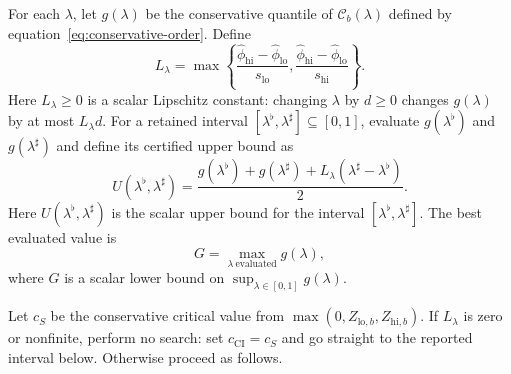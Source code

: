 \documentclass[11pt]{article}
\begin{document}
For each \(\lambda\), let \(g(\lambda)\) be the conservative quantile of
\(\mathcal C_b(\lambda)\) defined by equation~\eqref{eq:conservative-order}. Define
\begin{equation*}
 L_\lambda=\max\left\{
 \frac{\widehat\phi_{\mathrm{hi}}-\widehat\phi_{\mathrm{lo}}}{s_{\mathrm{lo}}},
 \frac{\widehat\phi_{\mathrm{hi}}-\widehat\phi_{\mathrm{lo}}}{s_{\mathrm{hi}}}
 \right\}.
\end{equation*}
Here \(L_\lambda\ge0\) is a scalar Lipschitz constant: changing \(\lambda\) by \(d\ge0\) changes
\(g(\lambda)\) by at most \(L_\lambda d\). For a retained interval \([\lambda^{\flat},\lambda^{\sharp}]\subseteq[0,1]\), evaluate
\(g(\lambda^{\flat})\) and \(g(\lambda^{\sharp})\) and define its certified upper bound as
\begin{equation*}
 U(\lambda^{\flat},\lambda^{\sharp})=\frac{g(\lambda^{\flat})+g(\lambda^{\sharp})+L_\lambda(\lambda^{\sharp}-\lambda^{\flat})}{2}.
\end{equation*}
Here \(U(\lambda^{\flat},\lambda^{\sharp})\) is the scalar upper bound for the interval
\([\lambda^{\flat},\lambda^{\sharp}]\). The best evaluated value is
\begin{equation*}
 G=\max_{\lambda\ \mathrm{evaluated}}g(\lambda),
\end{equation*}
where \(G\) is a scalar lower bound on \(\sup_{\lambda\in[0,1]}g(\lambda)\).

Let \(c_S\) be the conservative critical value from
\(\max(0,Z_{\mathrm{lo},b},Z_{\mathrm{hi},b})\). If \(L_\lambda\) is zero or nonfinite, perform no
search: set \(c_{\mathrm{CI}}=c_S\) and go straight to the reported interval below. Otherwise
proceed as follows.
\end{document}

